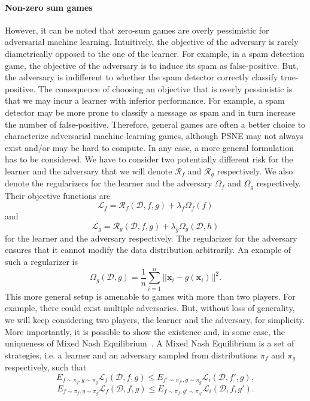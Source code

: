 \paragraph{Non-zero sum games} However, it can be noted that zero-sum games are overly pessimistic for adversarial machine learning. Intuitively, the objective of the adversary is rarely diametrically opposed to the one of the learner. For example, in a spam detection game, the objective of the adversary is to induce its spam as false-positive. But, the adversary is indifferent to whether the spam detector correctly classify true-positive. The consequence of choosing an objective that is overly pessimistic is that we may incur a learner with inferior performance. For example, a spam detector may be more prone to classify a message as spam and in turn increase the number of false-positive. Therefore, general games are often a better choice to characterize adversarial machine learning games, although PSNE may not always exist and/or may be hard to compute. In any case, a more general formulation has to be considered. We have to consider two potentially different risk for the learner and the adversary that we will denote $\mathcal{R}_f$ and $\mathcal{R}_g$ respectively. We also denote the regularizers for the learner and the adversary $\Omega_f$ and $\Omega_g$ respectively. Their objective functions are \[\mathcal{L}_f=\mathcal{R}_f(\mathcal{D},f,g) + \lambda_f\Omega_f(f)\] and \[\mathcal{L}_g=\mathcal{R}_g(\mathcal{D},f,g)+\lambda_g\Omega_g(\mathcal{D},h)\] for the learner and the adversary respectively. The regularizer for the adversary ensures that it cannot modify the data distribution arbitrarily. An example of such a regularizer is
\[
\Omega_g(\mathcal{D}, g) = \dfrac{1}{n}\sum_{i=1}^n||\bm x_i - g(\bm x_i)||^2.
\]
This more general setup is amenable to games with more than two players. For example, there could exist multiple adversaries. But, without loss of generality, we will keep considering two players, the learner and the adversary, for simplicity. More importantly, it is possible to show the existence and, in some case, the uniqueness of Mixed Nash Equilibrium~\cite{bruckner_static_aml,dritsoula_game_ml}. A Mixed Nash Equilibrium is a set of strategies, i.e. a learner and an adversary sampled from distributions $\pi_f$ and $\pi_g$ respectively, such that
\[
E_{f\sim\pi_f,g\sim\pi_g}\mathcal{L}_f(\mathcal{D},f, g)\leq E_{f' \sim\pi_{f'}, g\sim\pi_g}\mathcal{L}_i(\mathcal{D},f', g),
\]
\[ 
E_{f\sim\pi_f,g\sim\pi_g}\mathcal{L}_f(\mathcal{D},f, g)\leq E_{f \sim\pi_{f}, g'\sim\pi_{g'}}\mathcal{L}_i(\mathcal{D},f, g').
\]


